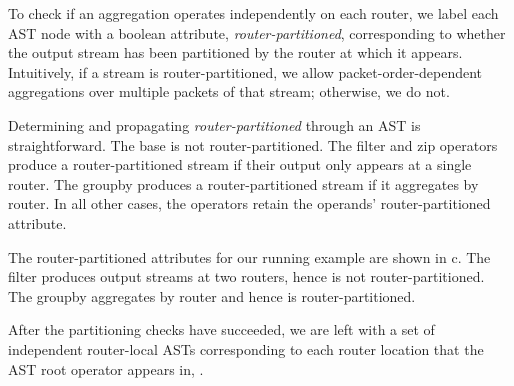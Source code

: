 To check if an aggregation operates independently on each router, we label each
AST node with a boolean attribute, {\em router-partitioned}, corresponding to
whether the output stream has been partitioned by the router at which it
appears. Intuitively, if a stream is router-partitioned, we allow
packet-order-dependent aggregations over multiple packets of that stream;
otherwise, we do not.

Determining and propagating {\em router-partitioned} through an AST is
straightforward. The base {\ct \pktlog} is not router-partitioned. The {\ct
filter} and {\ct zip} operators produce a router-partitioned stream if their
output only appears at a single router. The {\ct groupby} produces a
router-partitioned stream if it aggregates by {\ct router.} In all other cases,
the operators retain the operands' router-partitioned attribute.

The router-partitioned attributes for our running example are shown in
c. The {\ct filter} produces output streams at
two routers, hence is not router-partitioned. The {\ct groupby} aggregates by
{\ct router} and hence is router-partitioned.

After the partitioning checks have succeeded, we are left with a set of
independent router-local ASTs corresponding to each router location that the
AST root operator appears in, .
